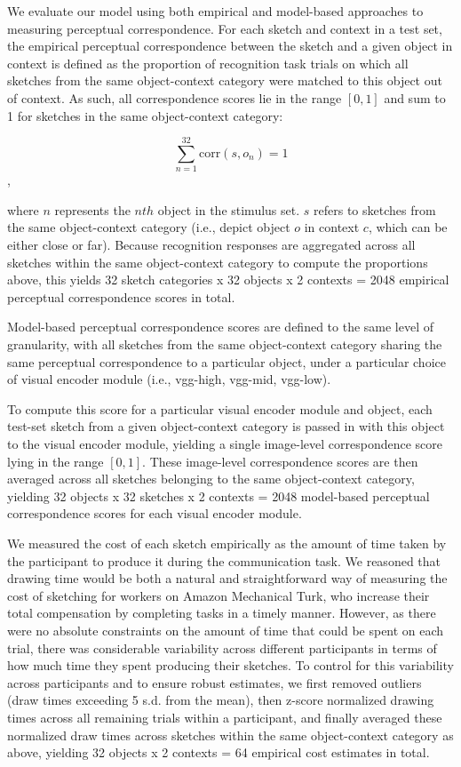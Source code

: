 \documentclass[9pt,twocolumn,twoside]{pnas-new}
\begin{document}
{We evaluate our model using both empirical and model-based approaches to measuring perceptual correspondence. For each sketch and context in a test set, the empirical perceptual correspondence between the sketch and a given object in context is defined as the proportion of recognition task trials on which all sketches from the same object-context category were matched to this object out of context. As such, all correspondence scores lie in the range $[0,1]$ and sum to 1 for sketches in the same object-context category:

$$\sum_{n=1}^{32} \textrm{corr} (s,o_{n}) = 1 $$,

where $n$ represents the $nth$ object in the stimulus set. $s$ refers to sketches from the same object-context category (i.e., depict object $o$ in context $c$, which can be either close or far). Because recognition responses are aggregated across all sketches within the same object-context category to compute the proportions above, this yields 32 sketch categories x 32 objects x 2 contexts = 2048 empirical perceptual correspondence scores in total.

Model-based perceptual correspondence scores are defined to the same level of granularity, with all sketches from the same object-context category sharing the same perceptual correspondence to a particular object, under a particular choice of visual encoder module (i.e., vgg-high, vgg-mid, vgg-low).

To compute this score for a particular visual encoder module and object, each test-set sketch from a given object-context category is passed in with this object to the visual encoder module, yielding a single image-level correspondence score lying in the range $[0,1]$. These image-level correspondence scores are then averaged across all sketches belonging to the same object-context category, yielding 32 objects x 32 sketches x 2 contexts  = 2048 model-based perceptual correspondence scores for each visual encoder module.

We measured the cost of each sketch empirically as the amount of time taken by the participant to produce it during the communication task. We reasoned that drawing time would be both a natural and straightforward way of measuring the cost of sketching for workers on Amazon Mechanical Turk, who increase their total compensation by completing tasks in a timely manner. However, as there were no absolute constraints on the amount of time that could be spent on each trial, there was considerable variability across different participants in terms of how much time they spent producing their sketches. To control for this variability across participants and to ensure robust estimates, we first removed outliers (draw times exceeding 5 s.d. from the mean), then z-score normalized drawing times across all remaining trials within a participant, and finally averaged these normalized draw times across sketches within the same object-context category as above, yielding 32 objects x 2 contexts = 64 empirical cost estimates in total.

}
\end{document}
